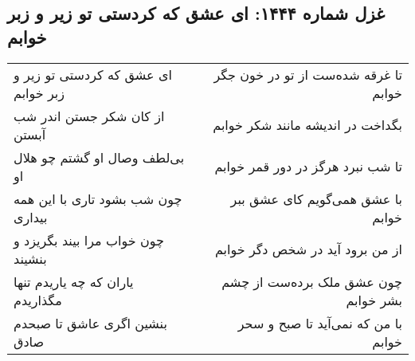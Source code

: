 \begin{center}
\section*{غزل شماره ۱۴۴۴: ای عشق که کردستی تو زیر و زبر خوابم}
\label{sec:1444}
\begin{longtable}{l p{0.5cm} r}
ای عشق که کردستی تو زیر و زبر خوابم
&&
تا غرقه شده‌ست از تو در خون جگر خوابم
\\
از کان شکر جستن اندر شب آبستن
&&
بگداخت در اندیشه مانند شکر خوابم
\\
بی‌لطف وصال او گشتم چو هلال او
&&
تا شب نبرد هرگز در دور قمر خوابم
\\
چون شب بشود تاری با این همه بیداری
&&
با عشق همی‌گویم کای عشق ببر خوابم
\\
چون خواب مرا بیند بگریزد و بنشیند
&&
از من برود آید در شخص دگر خوابم
\\
یاران که چه یاریدم تنها مگذاریدم
&&
چون عشق ملک برده‌ست از چشم بشر خوابم
\\
بنشین اگری عاشق تا صبحدم صادق
&&
با من که نمی‌آید تا صبح و سحر خوابم
\\
\end{longtable}
\end{center}
